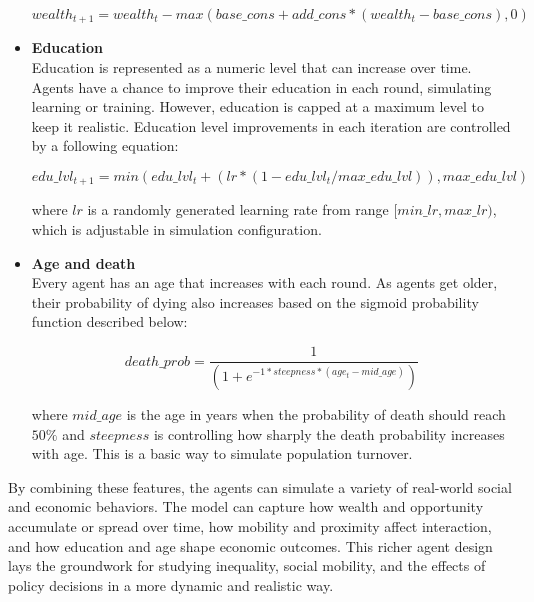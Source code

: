 \documentclass[english]{projectreport}
\begin{document}
\begin{itemize}
        \begin{equation}
            wealth_{t + 1} = wealth_{t} - max(base\_cons + add\_cons * (wealth_{t} - base\_cons), 0)
        \end{equation}
        
    \item \textbf{Education} \\
        Education is represented as a numeric level that can increase over time. Agents have a chance to improve their education in each round, simulating learning or training. However, education is capped at a maximum level to keep it realistic. Education level improvements in each iteration are controlled by a following equation:

        \begin{equation}
            edu\_lvl_{t + 1} = min(edu\_lvl_{t} + (lr * (1 - edu\_lvl_{t} / max\_edu\_lvl)), max\_edu\_lvl)
        \end{equation}

        where $lr$ is a randomly generated learning rate from range $[min\_lr, max\_lr)$, which is adjustable in simulation configuration.
        
    \item \textbf{Age and death} \\
        Every agent has an age that increases with each round. As agents get older, their probability of dying also increases based on the sigmoid probability function described below:

        \begin{equation}
            death\_prob = \frac{1}{( 1 + e^{-1 * steepness * (age_{t} - mid\_age)} )}
        \end{equation}

        where $mid\_age$ is the age in years when the probability of death should reach $50\%$ and $steepness$ is controlling how sharply the death probability increases with age. This is a basic way to simulate population turnover.
        
\end{itemize}

By combining these features, the agents can simulate a variety of real-world social and economic behaviors. The model can capture how wealth and opportunity accumulate or spread over time, how mobility and proximity affect interaction, and how education and age shape economic outcomes. This richer agent design lays the groundwork for studying inequality, social mobility, and the effects of policy decisions in a more dynamic and realistic way.
\end{document}
